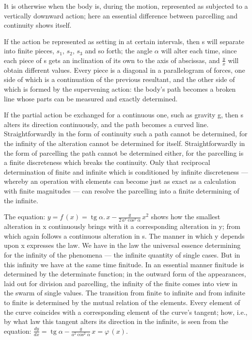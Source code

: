 \documentclass[12pt,a4paper]{book}
\begin{document}
It is otherwise when the body is, during the motion, represented as subjected to a
vertically downward action; here an essential difference between parcelling and
continuity shows itself.

If the action be represented as setting in at certain intervals, then s will separate
into finite pieces, $s_1$, $s_2$, $s_3$ and so forth; the angle $\alpha$ will alter
each time, since each piece of s gets an inclination of its own to the axis of
abscissas, and $\frac{y}{x}$ will obtain different values. Every piece is a diagonal
in a parallelogram of forces, one side of which is a continuation of the previous
resultant, and the other side of which is formed by the supervening action: the
body's path becomes a broken line whose parts can be measured and exactly determined.

If the partial action be exchanged for a continuous one, such as gravity g, then s
alters its direction continuously, and the path becomes a curved line. Straightforwardly
in the form of continuity such a path cannot be determined, for the infinity of the
alteration cannot be determined for itself. Straightforwardly in the form of parcelling
the path cannot be determined either, for the parcelling is a finite discreteness which
breaks the continuity. Only that reciprocal determination of finite and infinite which
is conditioned by infinite discreteness --- whereby an operation with elements can
become just as exact as a calculation with finite magnitudes --- can resolve the
parcelling into a finite determining of the infinite.

The equation: $y = f\,(x) = \operatorname{tg} \alpha .\, x -
\frac{g}{2\,a^2 \cos^2 \alpha}\, x^2$
shows how the smallest alteration in x continuously brings with it a corresponding
alteration in y; from which again follows a continuous alteration in s. The manner
in which y depends upon x expresses the law. We have in the law the universal essence
determining for the infinity of the phenomena --- the infinite quantity of single
cases. But in this infinity we have at the same time finitude. In an essential manner
finitude is determined by the determinate function; in the outward form of the
appearances, laid out for division and parcelling, the infinity of the finite comes
into view in the swarm of single values. The transition from finite to infinite and
from infinite to finite is determined by the mutual relation of the elements. Every
element of the curve coincides with a corresponding element of the curve's tangent;
how, i.e., by what law this tangent alters its direction in the infinite, is seen from
the equation: $\frac{dy}{dx} = \operatorname{tg} \alpha -
\frac{g}{a^2 \cos^2 \alpha}\, x = \varphi\,(x)$.
\end{document}

